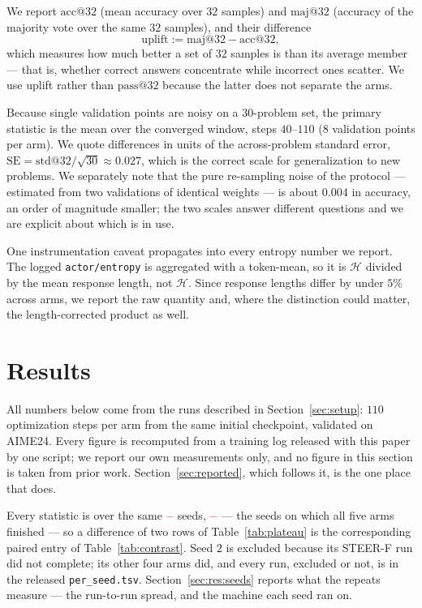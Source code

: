 \documentclass[11pt]{article}
\newcommand{\Htraj}{\mathcal{H}}
\providecommand{\PENDING}{\textcolor{red}{\textbf{--}}}
\newcommand{\num}[1]{\ifcsname #1\endcsname\csname #1\endcsname\else\PENDING\fi}
\begin{document}
We report $\mathrm{acc@}32$ (mean accuracy over $32$ samples) and $\mathrm{maj@}32$
(accuracy of the majority vote over the same $32$ samples), and their difference
%
\begin{equation*}
\mathrm{uplift} := \mathrm{maj@}32 - \mathrm{acc@}32,
\end{equation*}
%
which measures how much better a set of $32$ samples is than its average member ---
that is, whether correct answers concentrate while incorrect ones scatter. We use
uplift rather than $\mathrm{pass@}32$ because the latter does not separate the arms.

Because single validation points are noisy on a $30$-problem set, the primary
statistic is the mean over the converged window, steps $40$--$110$ ($8$ validation
points per arm). We quote differences in units of the across-problem standard error,
$\mathrm{SE} = \mathrm{std@}32 / \sqrt{30} \approx 0.027$, which is the correct scale
for generalization to new problems. We separately note that the pure re-sampling
noise of the protocol --- estimated from two validations of identical weights --- is
about $0.004$ in accuracy, an order of magnitude smaller; the two scales answer
different questions and we are explicit about which is in use.

One instrumentation caveat propagates into every entropy number we report. The
logged \texttt{actor/entropy} is aggregated with a token-mean, so it is
$\Htraj$ divided by the mean response length, not $\Htraj$. Since response lengths
differ by under $5\%$ across arms, we report the raw quantity and, where the
distinction could matter, the length-corrected product as well.

\section{Results}
\label{sec:results}

All numbers below come from the runs described in Section~\ref{sec:setup}:
$110$ optimization steps per arm from the same initial checkpoint, validated on
AIME24. Every figure is recomputed from a training log released with this paper by
one script; we report our own measurements only, and no figure in this section is
taken from prior work. Section~\ref{sec:reported}, which follows it, is the one place
that does.

Every statistic is over the same $\num{Nseedsused}$ seeds, $\num{Seedset}$ --- the
seeds on which all five arms finished --- so a difference of two rows of
Table~\ref{tab:plateau} is the corresponding paired entry of
Table~\ref{tab:contrast}. Seed $2$ is excluded because its STEER-F run did not
complete; its other four arms did, and every run, excluded or not, is in the
released \texttt{per\_seed.tsv}. Section~\ref{sec:res:seeds} reports what the
repeats measure --- the run-to-run spread, and the machine each seed ran on.
\end{document}

